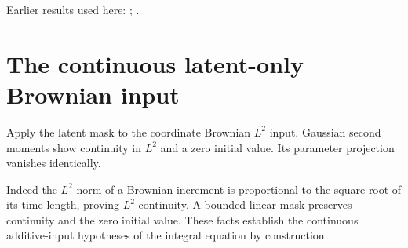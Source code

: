 \documentclass[11pt,a4paper]{article}
\begin{document}
Earlier results used here: \cite[Section~3.13.2]{LangevinLean2026ULASC}; \cite[Section~3.1.1]{LangevinLean2026IPLA}.

\section{\texorpdfstring{The continuous latent-only Brownian input}{The continuous latent-only Brownian input}}


Apply the latent mask to the coordinate Brownian \(L^2\) input. Gaussian second moments show continuity in \(L^2\) and a zero initial value. Its parameter projection vanishes identically.



Indeed the \(L^2\) norm of a Brownian increment is proportional to the square root of its time length, proving \(L^2\) continuity. A bounded linear mask preserves continuity and the zero initial value. These facts establish the continuous additive-input hypotheses of the integral equation by construction.
\end{document}
